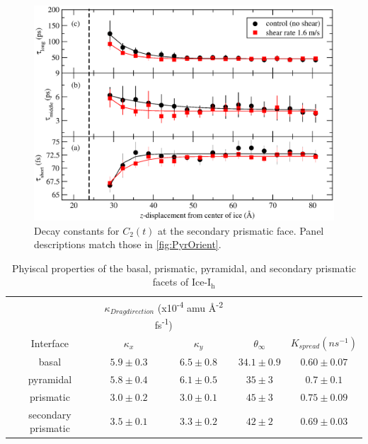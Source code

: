 \documentclass{pnastwo}
\begin{document}
\begin{figure}
\includegraphics[width=\linewidth]{SP-orient-less}
\caption{\label{fig:SPorient} Decay constants for $C_2(t)$ at the secondary 
prismatic face. Panel descriptions match those in \ref{fig:PyrOrient}.}
\end{figure}


\begin{table}[h]
\centering
\caption{Phyiscal properties of the basal, prismatic, pyramidal, and secondary prismatic facets of Ice-I$_\mathrm{h}$}
\label{tab:kappa}
\begin{tabular}{|ccccc|}  \hline
           & \multicolumn{2}{c}{$\kappa_{Drag direction}$
             (x10\textsuperscript{-4} amu \AA\textsuperscript{-2} fs\textsuperscript{-1})} & & \\
 Interface & $\kappa_{x}$     & $\kappa_{y}$  & $\theta_{\infty}$ & $K_{spread} (ns^{-1})$   \\ \hline
     basal & $5.9 \pm 0.3$ & $6.5 \pm 0.8$ & $34.1 \pm 0.9$ & $0.60 \pm 0.07$  \\
 pyramidal & $5.8 \pm 0.4$ & $6.1 \pm 0.5$ & $35 \pm 3$ & $0.7 \pm 0.1$ \\
 prismatic & $3.0 \pm 0.2$ & $3.0 \pm 0.1$ & $45 \pm 3$ & $0.75 \pm 0.09$ \\
 secondary prismatic & $3.5 \pm 0.1$ & $3.3 \pm 0.2$ & $42 \pm 2$ & $0.69 \pm 0.03$ \\ \hline
\end{tabular}
\end{table}
\end{document}
